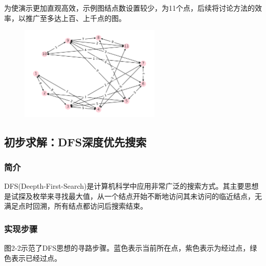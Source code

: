 \documentclass[12pt]{article}
\begin{document}
为使演示更加直观高效，示例图结点数设置较少，为11个点，后续将讨论方法的效率，以推广至多达上百、上千点的图。
\begin{figure}[htb]
    \centering
    \includegraphics[width = 0.6\textwidth]{assets/graph.png}
    \caption{\label{graph.png}}
\end{figure}
\subsection{初步求解：DFS深度优先搜索}
\subsubsection{简介}
DFS(Deepth-First-Search)是计算机科学中应用非常广泛的搜索方式。其主要思想是试探及枚举来寻找最大值，从一个结点开始不断地访问其未访问的临近结点，无满足点时回溯，所有结点都访问后搜索结束。
\subsubsection{实现步骤}
图2-2示范了DFS思想的寻路步骤。蓝色表示当前所在点，紫色表示为经过点，绿色表示已经过点。
\end{document}
